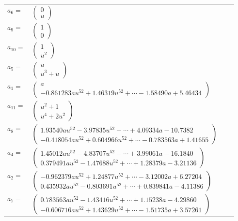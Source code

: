 \documentclass[1p]{elsarticle_modified}
\theoremstyle{definition}
\begin{document}
\begin{tabular}{m{7pt} m{180pt} m{7pt} m{180pt} }
\flushright $a_{6}=$&$\begin{pmatrix}0\\u\end{pmatrix}$ \\
\flushright $a_{9}=$&$\begin{pmatrix}1\\0\end{pmatrix}$ \\
\flushright $a_{10}=$&$\begin{pmatrix}1\\u^2\end{pmatrix}$ \\
\flushright $a_{5}=$&$\begin{pmatrix}u\\u^3+u\end{pmatrix}$ \\
\flushright $a_{1}=$&$\begin{pmatrix}a\\-0.861283 a u^{52}+1.46319 u^{52}+\cdots-1.58490 a+5.46434\end{pmatrix}$ \\
\flushright $a_{11}=$&$\begin{pmatrix}u^2+1\\u^4+2 u^2\end{pmatrix}$ \\
\flushright $a_{8}=$&$\begin{pmatrix}1.93540 a u^{52}-3.97835 u^{52}+\cdots+4.09334 a-10.7382\\-0.418054 a u^{52}+0.604966 u^{52}+\cdots-0.783563 a+1.41655\end{pmatrix}$ \\
\flushright $a_{4}=$&$\begin{pmatrix}1.45012 a u^{52}-4.83707 u^{52}+\cdots+3.99061 a-16.1840\\0.379491 a u^{52}-1.47688 u^{52}+\cdots+1.28379 a-3.21136\end{pmatrix}$ \\
\flushright $a_{2}=$&$\begin{pmatrix}-0.962379 a u^{52}+1.24877 u^{52}+\cdots-3.12002 a+6.27204\\0.435932 a u^{52}-0.803691 u^{52}+\cdots+0.839841 a-4.11386\end{pmatrix}$ \\
\flushright $a_{7}=$&$\begin{pmatrix}0.783563 a u^{52}-1.43416 u^{52}+\cdots+1.15238 a-4.29860\\-0.606716 a u^{52}+1.43629 u^{52}+\cdots-1.51735 a+3.57261\end{pmatrix}$ \\

\end{tabular}
\end{document}
